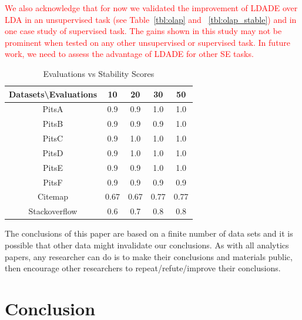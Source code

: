 \documentclass[twocolumn,5p,sort&compress]{elsarticle}
\theoremstyle{break}
\begin{document}

\textcolor{red}{We also acknowledge that for now we validated the improvement of LDADE over LDA in an unsupervised task (see Table~\ref{tbl:olap} and ~\ref{tbl:olap_stable}) and in one case study of supervised task. The gains shown in this study may not be prominent when tested on any other unsupervised or supervised task. In future work,
we need to
assess the advantage of  LDADE for other SE tasks.}

\begin{table}[!t]
\scriptsize
\begin{center}
\caption{Evaluations vs Stability Scores}
\label{tb:tablename1}
\begin{tabular}{|c|c|c|c|c|}
\hline 
\textbf{Datasets\textbackslash Evaluations} & \textbf{10} & \textbf{20} & \textbf{30} &
\textbf{50} \\[0.5ex]
\hline
PitsA & 0.9 & 0.9 & 1.0 & 1.0\\ 
\hline
PitsB & 0.9 & 0.9 & 0.9 & 1.0 \\
\hline
PitsC & 0.9 & 1.0 & 1.0 & 1.0\\ 
\hline
PitsD & 0.9 & 1.0 & 1.0 & 1.0\\ 
\hline
PitsE & 0.9 & 0.9 & 1.0 & 1.0\\
\hline
PitsF & 0.9 & 0.9 & 0.9 & 0.9\\
\hline
Citemap & 0.67 & 0.67 & 0.77 & 0.77\\
\hline
Stackoverflow & 0.6 & 0.7 & 0.8 & 0.8\\
\hline
\end{tabular}
\end{center}
\end{table}

The conclusions of this paper are based on a finite number of data sets and it is possible
that other data might invalidate our conclusions. As with all analytics papers, any researcher can do is to make their conclusions and materials public, then encourage
other researchers to repeat/refute/improve their conclusions.

\section{Conclusion}
\end{document}
